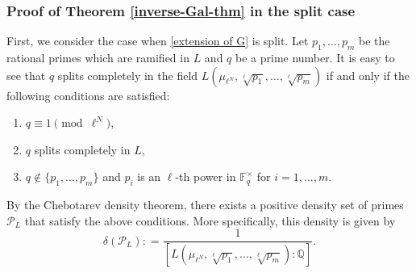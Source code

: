 \documentclass[11pt,reqno]{amsart}
\newcommand{\F}{\mathbb{F}}
\numberwithin{equation}{section}
\begin{document}
\subsubsection{Proof of Theorem \ref{inverse-Gal-thm} in the split case}\label{split-case-proof-subsubsection}
\par First, we consider the case when \eqref{extension of G} is split. Let $p_1, \dots, p_m$ be the rational primes which are ramified in $L$ and $q$ be a prime number. It is easy to see that $q$ splits completely in the field $L\left(\mu_{\ell^{N}}, \sqrt[\ell]{p_{1}}, \ldots, \sqrt[\ell]{p_{m}}\right)$ if and only if the following conditions are satisfied:
\begin{enumerate}
    \item[(i)] $q \equiv 1\pmod{\ell^{N}}$,
    \item[(ii)] $q$ splits completely in $L$,
    \item[(iii)] $q\notin \{p_1, \dots, p_m\}$ and $p_i$ is an $\ell$-th power in $\F_q^\times$ for $i=1, \dots, m$. 
\end{enumerate}
By the Chebotarev density theorem, there exists a positive density set of primes $\mathcal{P}_{L}$ that satisfy the above conditions. More specifically, this density is given by 
\begin{equation*}
    \delta(\mathcal{P}_L) : =\frac{1}{\left[ L\left(\mu_{\ell^{N}}, \sqrt[\ell]{p_{1}}, \ldots, \sqrt[\ell]{p_{m}}\right): \mathbb{Q}\right]}.
\end{equation*}
\end{document}
